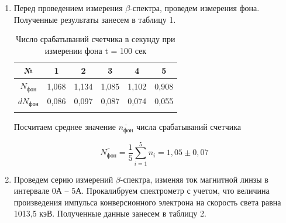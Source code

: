 \documentclass[a4paper, 12pt]{article}%
\begin{document}
	\begin{enumerate}
		
		
		\item  Перед проведением измерения $\beta$-спектра, проведем измерения фона. Полученные результаты занесем в таблицу 1.
		
		\begin{longtable}{|c|c|c|c|c|c|}
			\hline
			№ & 1 & 2 & 3 & 4 & 5\\ \hline
			$N_{\text{фон}}$ & 1,068 & 1,134 & 1,085 & 1,102 & 0,908 \\ \hline
			$dN_{\text{фон}}$ & 0,086 & 0,097 & 0,087 & 0,074 & 0,055 \\ \hline
			\caption{Число срабатываний счетчика в секунду при измерении фона t = 100 сек}
		\end{longtable}
		
		
		Посчитаем среднее значение $\overline{n_{\text{фон}}}$ числа срабатываний счетчика 
			
		
		$$\overline{N_{\text{фон}}} = \frac{1}{5} \sum_{i = 1}^{5} n_i = 1,05 \pm 0,07$$
		
		\item Проведем серию измерений $\beta$-спектра, изменяя ток магнитной линзы в интервале 0А -- 5А. Прокалибруем спектрометр с учетом, что величина произведения импульса конверсионного электрона на скорость света равна 1013,5 кэВ. Полученные данные занесем в таблицу 2.
		

\end{enumerate}
\end{document}
